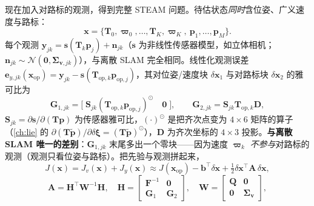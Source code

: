 现在加入对路标的观测，得到完整 STEAM 问题。待估状态\emph{同时}含位姿、广义速度与路标：
\begin{equation}
  \mathbf{x}=\{\mathbf{T}_0,\boldsymbol{\varpi}_0,\dots,\mathbf{T}_K,\boldsymbol{\varpi}_K,\ \mathbf{p}_1,\dots,\mathbf{p}_M\}.
  \label{eq:steam-state}
\end{equation}
每个观测 $\mathbf{y}_{jk}=\mathbf{s}(\mathbf{T}_k\mathbf{p}_j)+\mathbf{n}_{jk}$（$\mathbf{s}$ 为非线性传感器模型，如立体相机；$\mathbf{n}_{jk}\sim\mathcal{N}(\mathbf{0},\boldsymbol{\Sigma}_{\mathbf{v},jk})$），与离散 SLAM 完全相同。线性化观测误差 $\mathbf{e}_{y,jk}(\mathbf{x}_{\mathrm{op}})=\mathbf{y}_{jk}-\mathbf{s}(\mathbf{T}_{\mathrm{op},k}\mathbf{p}_{\mathrm{op},j})$，其对位姿/速度块 $\delta\mathbf{x}_1$ 与对路标块 $\delta\mathbf{x}_2$ 的雅可比为
\begin{equation}
  \mathbf{G}_{1,jk}=\big[\;\mathbf{S}_{jk}(\mathbf{T}_{\mathrm{op},k}\mathbf{p}_{\mathrm{op},j})^\odot\quad \mathbf{0}\;\big],\qquad
  \mathbf{G}_{2,jk}=\mathbf{S}_{jk}\mathbf{T}_{\mathrm{op},k}\mathbf{D},
  \label{eq:steam-G}
\end{equation}
$\mathbf{S}_{jk}=\partial\mathbf{s}/\partial(\mathbf{T}\mathbf{p})$ 为传感器雅可比，$(\cdot)^\odot$ 是把齐次点变为 $4\times6$ 矩阵的算子（\cref{ch:lie} 的 $\partial(\mathbf{T}\tilde{\mathbf{p}})/\partial\delta\boldsymbol{\xi}=(\mathbf{T}\tilde{\mathbf{p}})^\odot$），$\mathbf{D}$ 为齐次坐标的 $4\times3$ 投影。\textbf{与离散 SLAM 唯一的差别}：$\mathbf{G}_{1,jk}$ 末尾多出一个零块——因为速度 $\boldsymbol{\varpi}_k$ \emph{不参与}对路标的观测（观测只看位姿与路标）。把先验与观测拼起来，
\begin{equation}
  J(\mathbf{x})=J_v(\mathbf{x})+J_y(\mathbf{x})\approx J(\mathbf{x}_{\mathrm{op}})-\mathbf{b}^\top\delta\mathbf{x}+\tfrac12\delta\mathbf{x}^\top\mathbf{A}\,\delta\mathbf{x},
  \label{eq:steam-J}
\end{equation}
\begin{equation}
  \mathbf{A}=\mathbf{H}^\top\mathbf{W}^{-1}\mathbf{H},\quad
  \mathbf{H}=\begin{bmatrix}\mathbf{F}^{-1}&\mathbf{0}\\\mathbf{G}_1&\mathbf{G}_2\end{bmatrix},\quad
  \mathbf{W}=\begin{bmatrix}\mathbf{Q}&\mathbf{0}\\\mathbf{0}&\boldsymbol{\Sigma}_{\mathbf{v}}\end{bmatrix},
  \label{eq:steam-A}
\end{equation}
